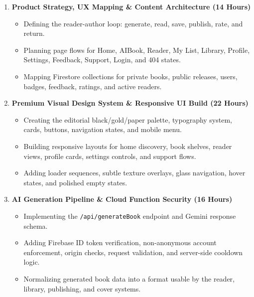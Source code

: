 \documentclass[11pt, a4paper]{article}
\begin{document}
\begin{enumerate}[label=\textcolor{abookigold}{\textbf{\arabic*.}}]
    \item \textbf{Product Strategy, UX Mapping \& Content Architecture (14 Hours)}
    \begin{itemize}[label=\textcolor{abookipaper}{\textbullet}]
        \item Defining the reader-author loop: generate, read, save, publish, rate, and return.
        \item Planning page flows for Home, AIBook, Reader, My List, Library, Profile, Settings, Feedback, Support, Login, and 404 states.
        \item Mapping Firestore collections for private books, public releases, users, badges, feedback, ratings, and active readers.
    \end{itemize}

    \item \textbf{Premium Visual Design System \& Responsive UI Build (22 Hours)}
    \begin{itemize}[label=\textcolor{abookipaper}{\textbullet}]
        \item Creating the editorial black/gold/paper palette, typography system, cards, buttons, navigation states, and mobile menu.
        \item Building responsive layouts for home discovery, book shelves, reader views, profile cards, settings controls, and support flows.
        \item Adding loader sequences, subtle texture overlays, glass navigation, hover states, and polished empty states.
    \end{itemize}

    \item \textbf{AI Generation Pipeline \& Cloud Function Security (16 Hours)}
    \begin{itemize}[label=\textcolor{abookipaper}{\textbullet}]
        \item Implementing the \texttt{/api/generateBook} endpoint and Gemini response schema.
        \item Adding Firebase ID token verification, non-anonymous account enforcement, origin checks, request validation, and server-side cooldown logic.
        \item Normalizing generated book data into a format usable by the reader, library, publishing, and cover systems.
    \end{itemize}


\end{enumerate}
\end{document}
